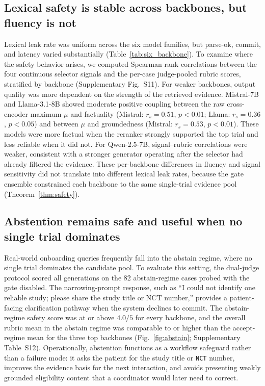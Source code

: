 \documentclass[pdflatex,Numbered]{sn-jnl}
\theoremstyle{plain}
\begin{document}
\subsection{Lexical safety is stable across backbones, but fluency is not}
\label{sec:results_backbone_gate}

Lexical leak rate was uniform across the six model families, but parse-ok, commit, and latency varied substantially (Table~\ref{tab:six_backbone}). To examine where the safety behavior arises, we computed Spearman rank correlations between the four continuous selector signals and the per-case judge-pooled rubric scores, stratified by backbone (Supplementary Fig.~S11). For weaker backbones, output quality was more dependent on the strength of the retrieved evidence. Mistral-7B and Llama-3.1-8B showed moderate positive coupling between the raw cross-encoder maximum $\mu$ and factuality (Mistral: $r_s = 0.51$, $p < 0.01$; Llama: $r_s = 0.36$, $p < 0.05$) and between $\mu$ and groundedness (Mistral: $r_s = 0.53$, $p < 0.01$). These models were more factual when the reranker strongly supported the top trial and less reliable when it did not. For Qwen-2.5-7B, signal--rubric correlations were weaker, consistent with a stronger generator operating after the selector had already filtered the evidence. These per-backbone differences in fluency and signal sensitivity did not translate into different lexical leak rates, because the gate ensemble constrained each backbone to the same single-trial evidence pool (Theorem~\ref{thm:safety}).

\subsection{Abstention remains safe and useful when no single trial dominates}
\label{sec:results_abstain}

Real-world onboarding queries frequently fall into the abstain regime, where no single trial dominates the candidate pool. To evaluate this setting, the dual-judge protocol scored all generations on the 82 abstain-regime cases probed with the gate disabled. The narrowing-prompt response, such as ``I could not identify one reliable study; please share the study title or NCT number,'' provides a patient-facing clarification pathway when the system declines to commit. The abstain-regime safety score was at or above $4.0/5$ for every backbone, and the overall rubric mean in the abstain regime was comparable to or higher than the accept-regime mean for the three top backbones (Fig.~\ref{fig:abstain}; Supplementary Table~S12). Operationally, abstention functions as a workflow safeguard rather than a failure mode: it asks the patient for the study title or \texttt{NCT} number, improves the evidence basis for the next interaction, and avoids presenting weakly grounded eligibility content that a coordinator would later need to correct.
\end{document}
